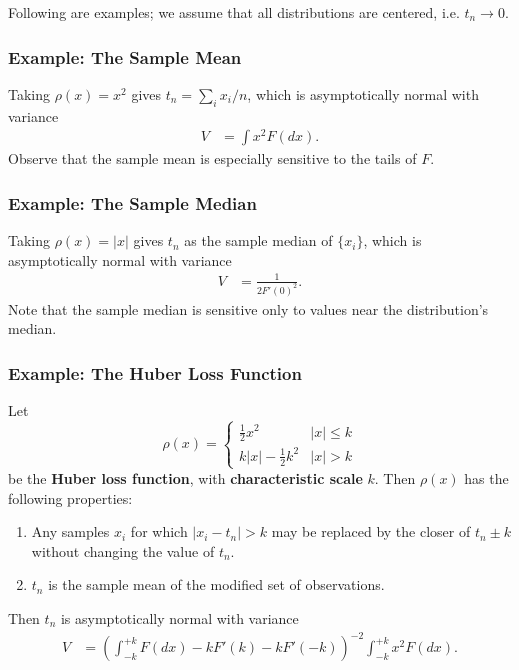 \documentclass[reqno]{amsart}
\numberwithin{equation}{section}
\begin{document}
Following are examples; we assume that all distributions are centered, i.e. $t_n \to 0$.

\subsubsection{Example: The Sample Mean}

Taking $\rho(x) = x^2$ gives $t_n = \sum_i x_i /n$, which is asymptotically normal with variance
\begin{align*}
    V & = \int x^2 F(dx).
\end{align*}
Observe that the sample mean is especially sensitive to the tails of $F$.

\subsubsection{Example: The Sample Median}

Taking $\rho(x) = |x|$ gives $t_n$ as the sample median of $\{x_i\}$, which is asymptotically normal with variance
\begin{align*}
    V & = \frac{1}{2F'(0)^2}.
\end{align*}
Note that the sample median is sensitive only to values near the distribution's median.

\subsubsection{Example: The Huber Loss Function}

Let
$$
\rho(x) =
\begin{cases}
    \frac{1}{2} x^2 & |x| \le k \\
    k|x| - \frac{1}{2} k^2 & |x| > k
\end{cases}
$$
be the \textbf{Huber loss function}, with \textbf{characteristic scale} $k$. Then $\rho(x)$ has the following properties:
\begin{enumerate}
    \item Any samples $x_i$ for which $|x_i - t_n| > k$ may be replaced by the closer of
    $t_n \pm k$ without changing the value
        of $t_n$.
    \item $t_n$ is the sample mean of the modified set of observations.
\end{enumerate}
Then $t_n$ is asymptotically normal with variance
\begin{align*}
    V & = \left(\int_{-k}^{+k} F(dx) - kF'(k) - kF'(-k)\right)^{-2} \int_{-k}^{+k} x^2F(dx).
\end{align*}
\end{document}
